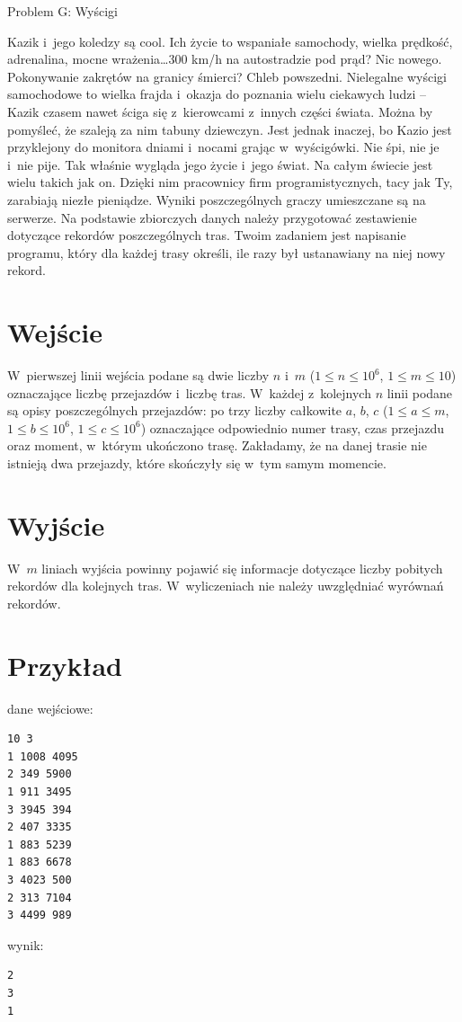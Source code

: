 \documentclass{article}
\begin{document}
\begin{center}
  \begin{Huge}
    Problem G: Wyścigi
  \end{Huge}
\end{center}

Kazik i~jego koledzy są cool. Ich życie to wspaniałe samochody, wielka prędkość, adrenalina,
mocne wrażenia\ldots300 km/h na autostradzie pod prąd? Nic nowego. Pokonywanie zakrętów na
granicy śmierci? Chleb powszedni. Nielegalne wyścigi samochodowe to wielka frajda i~okazja do
poznania wielu ciekawych ludzi -- Kazik czasem nawet ściga się z~kierowcami z~innych części
świata. Można by pomyśleć, że szaleją za nim tabuny dziewczyn. Jest jednak inaczej, bo Kazio jest
przyklejony do monitora dniami i~nocami grając w~wyścigówki. Nie śpi, nie je i~nie pije. Tak
właśnie wygląda jego życie i~jego świat. Na całym świecie jest wielu takich jak on. Dzięki nim
pracownicy firm programistycznych, tacy jak Ty, zarabiają niezłe pieniądze. Wyniki
poszczególnych graczy umieszczane są na serwerze. Na podstawie zbiorczych danych należy
przygotować zestawienie dotyczące rekordów poszczególnych tras. Twoim zadaniem jest napisanie
programu, który dla każdej trasy określi, ile razy był ustanawiany na niej nowy rekord.

\section*{Wejście}

W~pierwszej linii wejścia podane są dwie liczby $n$ i~$m$ ($1\leqslant n\leqslant 10^6$, $1\leqslant m\leqslant 10$) oznaczające liczbę
przejazdów i~liczbę tras. W~każdej z~kolejnych $n$ linii podane są opisy poszczególnych przejazdów:
po trzy liczby całkowite $a$, $b$, $c$ ($1\leqslant a\leqslant m$, $1\leqslant b\leqslant 10^6$, $1\leqslant c\leqslant 10^6$) oznaczające odpowiednio
numer trasy, czas przejazdu oraz moment, w~którym ukończono trasę. Zakładamy, że na danej trasie
nie istnieją dwa przejazdy, które skończyły się w~tym samym momencie.

\section*{Wyjście}

W~$m$ liniach wyjścia powinny pojawić się informacje dotyczące liczby pobitych rekordów dla
kolejnych tras. W~wyliczeniach nie należy uwzględniać wyrównań rekordów.

\section*{Przykład}
dane wejściowe:
\begin{verbatim}
10 3
1 1008 4095
2 349 5900
1 911 3495
3 3945 394
2 407 3335
1 883 5239
1 883 6678
3 4023 500
2 313 7104
3 4499 989
\end{verbatim}
wynik:
\begin{verbatim}
2
3
1
\end{verbatim}
\end{document}
